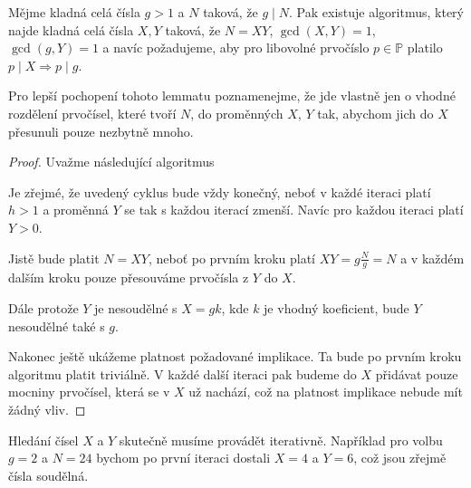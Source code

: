 \begin{lem} \label{factorization}
    Mějme kladná celá čísla $ g > 1 $ a $ N $ taková, že $ g \mid N $. Pak
    existuje algoritmus, který najde kladná celá čísla $ X, Y $ taková, že
    $ N = XY $, $ \gcd(X, Y) = 1 $, $ \gcd(g, Y) = 1 $ a navíc požadujeme, aby
    pro libovolné prvočíslo $ p \in \mathbb{P} $ platilo
    $ p \mid X \Rightarrow p \mid g $.
\end{lem}
\begin{pozn}
Pro lepší pochopení tohoto lemmatu poznamenejme, že jde vlastně jen o vhodné
rozdělení prvočísel, které tvoří $ N $, do proměnných $ X $, $ Y $ tak, abychom
jich do $ X $ přesunuli pouze nezbytně mnoho.
\end{pozn}
\begin{proof}
    Uvažme následující algoritmus\\
    \begin{algorithm}[H] \label{factorization_Algo}
    \end{algorithm}

    Je zřejmé, že uvedený cyklus bude vždy konečný, neboť v každé iteraci platí
    $ h > 1 $ a proměnná $ Y $ se tak s každou iterací zmenší. Navíc pro každou
    iteraci platí $ Y > 0 $.

    Jistě bude platit $ N = XY $, neboť po prvním kroku platí
    $ XY = g \frac{N}{g} = N $ a v každém dalším kroku pouze přesouváme
    prvočísla z $ Y $ do $ X $.

    Dále protože $ Y $ je nesoudělné s $ X = gk $, kde $ k $ je vhodný koeficient,
    bude $ Y $ nesoudělné také s $ g $.

    Nakonec ještě ukážeme platnost požadované implikace. Ta bude po prvním kroku
    algoritmu platit triviálně. V každé další iteraci pak budeme do $ X $
    přidávat pouze mocniny prvočísel, která se v $ X $ už nachází, což na platnost
    implikace nebude mít žádný vliv.
\end{proof}
\begin{pozn}
Hledání čísel $ X $ a $ Y $ skutečně musíme provádět iterativně. Například pro
volbu $ g = 2 $ a $ N = 24 $ bychom po první iteraci dostali $ X = 4 $ a $ Y = 6 $,
což jsou zřejmě čísla soudělná.
\end{pozn}

